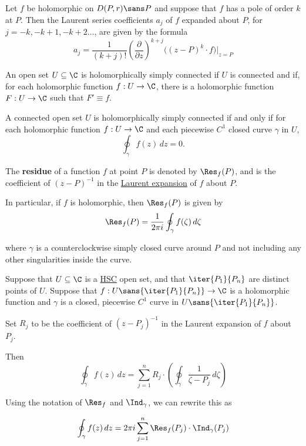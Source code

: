 Let $f$ be holomorphic on $D(P,r)\sans P$ and suppose that $f$ has a pole of
order $k$ at $P$. Then the Laurent series coefficients $a_j$ of $f$ expanded
about $P$, for $j=-k,-k+1,-k+2\ldots$, are given by the formula
$$
  a_j=\frac1{(k+j)!}\left(\frac\partial{\partial z}\right)^{k+j}
  \big((z-P)^k\cdot f\big)\Bigg|_{z=P}
$$

\label{d20898f}

An open set $U\subseteq\C$ is holomorphically simply connected if $U$ is
connected and if, for each holomorphic function $f:U\to\C$, there is a
holomorphic function $F:U\to\C$ such that $F'\equiv f$.

\label{f3a867e}

A connected open set $U$ is holomorphically simply connected if and only if for
each holomorphic function $f:U\to\C$ and each piecewise $C^1$ closed curve
$\gamma$ in $U$,
$$
  \oint_\gamma f(z)\,dz=0.
$$

\label{ea3ff58}

The \textbf{residue} of a function $f$ at point $P$ is denoted by $\Res_f(P)$,
and is the coefficient of $(z-P)^{-1}$ in the \href{e7fa5f8}{Laurent expansion}
of $f$ about $P$.

In particular, if $f$ is holomorphic, then $\Res_f(P)$ is given by
$$
  \Res_f(P)=\frac1{2\pi i}\oint_\gamma f(\zeta)\,d\zeta
$$

where $\gamma$ is a counterclockwise simply closed curve around $P$ and not
including any other singularities inside the curve.

\label{e1efb5a}

Suppose that $U\subseteq\C$ is a \href{d20898f}{HSC} open set, and that
$\iter{P_1}{P_n}$ are distinct points of $U$. Suppose that
$f:U\sans{\iter{P_1}{P_n}}\to\C$ is a holomorphic function and $\gamma$ is a
closed, piecewise $C^1$ curve in $U\sans{\iter{P_1}{P_n}}$.

Set $R_j$ to be the coefficient of $(z-P_j)^{-1}$ in the Laurent expansion of
$f$ about $P_j$.

Then
$$
  \oint_\gamma f(z)\,dz=\sum_{j=1}^nR_j\cdot\left(\oint_\gamma\frac1{\zeta-P_j}\,d\zeta\right)
$$

Using the notation of \href{ea3ff58}{$\Res_f$} and
\href{bfdcc82}{$\Ind_\gamma$}, we can rewrite this as

$$
  \oint_\gamma f(z)\,dz=2\pi i\sum_{j=1}^n\Res_f(P_j)\cdot\Ind_\gamma(P_j)
$$

